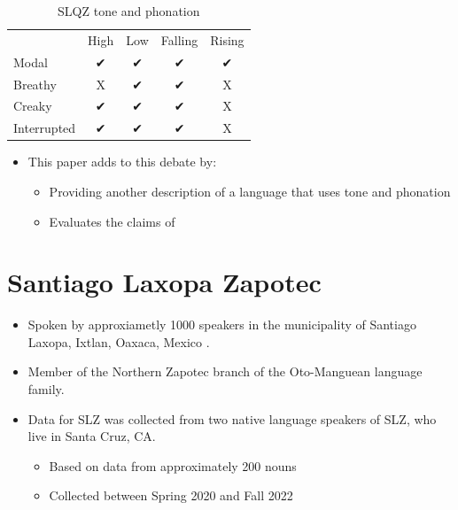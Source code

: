 \documentclass[12pt, letterpaper]{article}
\providecommand{\lsptoprule}{\midrule\toprule}
\providecommand{\lspbottomrule}{\bottomrule\midrule}
\begin{document}
\begin{table}[!ht]
	\centering
	\caption{SLQZ tone and phonation}
	\label{tab:SLQZ}
	 \begin{tabular}{lcccc}
	  \lsptoprule
					  &	 High  & Low & Falling & Rising \\
		  Modal	& ✔︎ & ✔︎ & ✔︎ & ✔︎ \\
		  Breathy & X & ✔︎ & ✔︎ & X \\
		  Creaky & ✔︎ & ✔︎ & ✔︎ & X \\
		  Interrupted & ✔︎ & ✔︎ & ✔︎ & X \\
	  \lspbottomrule
	 \end{tabular}
	\end{table}
\begin{itemize}
	\item This paper adds to this debate by:
	\begin{itemize}
		\item Providing another description of a language that uses tone and phonation
		\item Evaluates the claims of 
	\end{itemize}
\end{itemize}



\section{Santiago Laxopa Zapotec} \label{sec:SLZ}

\begin{itemize}
	\item Spoken by approxiametly 1000 speakers in the municipality of Santiago Laxopa, Ixtlan, Oaxaca, Mexico \citep{adlerAcousticsPhonationTypes2016,adlerDerivationVerbInitiality2018,foleyForbiddenCliticClusters2018,foleyExtendingPersonCaseConstraint2020}. 
	\item Member of the Northern Zapotec branch of the Oto-Manguean language family.
	\item Data for SLZ was collected from two native language speakers of SLZ, who live in Santa Cruz, CA. 
	\begin{itemize}
		\item Based on data from approximately 200 nouns
		\item Collected between Spring 2020 and Fall 2022
	\end{itemize}
\end{itemize}
\end{document}
